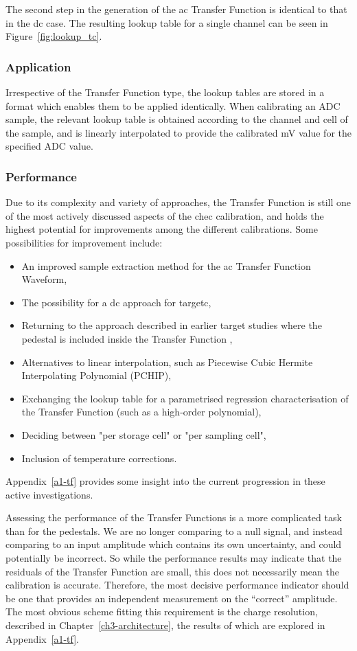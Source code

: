 The second step in the generation of the \gls{ac} Transfer Function is identical to that in the \gls{dc} case. The resulting lookup table for a single channel can be seen in Figure~\ref{fig:lookup_tc}.

\subsubsection{Application}

Irrespective of the Transfer Function type, the lookup tables are stored in a format which enables them to be applied identically. When calibrating an ADC sample, the relevant lookup table is obtained according to the channel and cell of the sample, and is linearly interpolated to provide the calibrated \si{mV} value for the specified ADC value.

\subsubsection{Performance}

Due to its complexity and variety of approaches, the Transfer Function is still one of the most actively discussed aspects of the \gls{chec} calibration, and holds the highest potential for improvements among the different calibrations. Some possibilities for improvement include:
\begin{itemize}
	\item An improved sample extraction method for the \gls{ac} Transfer Function Waveform,
	\item The possibility for a \gls{dc} approach for \gls{targetc},
	\item Returning to the approach described in earlier \gls{target} studies where the pedestal is included inside the Transfer Function \cite{Albert2017},
	\item Alternatives to linear interpolation, such as Piecewise Cubic Hermite Interpolating Polynomial (PCHIP),
	\item Exchanging the lookup table for a parametrised regression characterisation of the Transfer Function (such as a high-order polynomial),
	\item Deciding between "per storage cell" or "per sampling cell",
	\item Inclusion of temperature corrections.
\end{itemize}
Appendix~\ref{a1-tf} provides some insight into the current progression in these active investigations.

Assessing the performance of the Transfer Functions is a more complicated task than for the pedestals. We are no longer comparing to a null signal, and instead comparing to an input amplitude which contains its own uncertainty, and could potentially be incorrect. So while the performance results may indicate that the residuals of the Transfer Function are small, this does not necessarily mean the calibration is accurate. Therefore, the most decisive performance indicator should be one that provides an independent measurement on the ``correct'' amplitude. The most obvious scheme fitting this requirement is the charge resolution, described in Chapter~\ref{ch3-architecture}, the results of which are explored in Appendix~\ref{a1-tf}.

